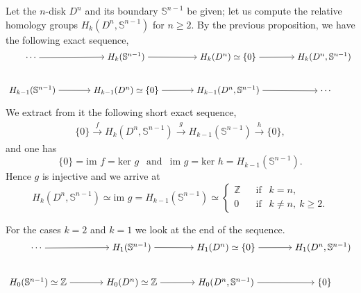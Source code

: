 \begin{example}
\label{hom_relat_disco}
Let the $n$-disk $D^n$ and its boundary $\mathbb{S}^{n-1}$ be given; let us compute the relative homology groups $H_k(D^n,\mathbb{S}^{n-1})$ for $n\ge 2$. By the previous proposition, we have the following exact sequence,
\[
\begin{tikzcd}[
  column sep=large,
  row sep=large,
  every cell/.style={math mode},
  remember picture
]
\cdots ~ \arrow[r] &
 ~ H_k(\mathbb{S}^{n-1})~  \arrow[r] &
~ H_k(D^n)\simeq \{0\} ~ \arrow[r] &
|[alias=topend]| ~H_k(D^n,\mathbb{S}^{n-1})~ \\
|[alias=botstart]| ~H_{k-1}(\mathbb{S}^{n-1})~ \arrow[r] &
~H_{k-1}(D^n)\simeq \{0\}~ \arrow[r] &
~H_{k-1}(D^n,\mathbb{S}^{n-1})~ \arrow[r] &
~\cdots
\end{tikzcd}
\]

We extract from it the following short exact sequence,
\begin{align*}
    \{0\}\overset{f}{\longrightarrow} H_k(D^n,\mathbb{S}^{n-1}) \overset{g}{\longrightarrow} H_{k-1}(\mathbb{S}^{n-1}) \overset{h}{\longrightarrow} \{0\},
\end{align*}
and one has
\begin{equation*}
    \{0\} = \text{im }f = \text{ker }g ~~\text{ and }~~ \text{im }g = \text{ker }h = H_{k-1}(\mathbb{S}^{n-1}).
\end{equation*}
Hence $g$ is injective and we arrive at
\begin{equation*}
    H_k(D^n,\mathbb{S}^{n-1}) \simeq \text{im }g = H_{k-1}(\mathbb{S}^{n-1}) \simeq
    \begin{cases}
        \mathbb{Z} &~~\text{ if }~~ k=n,\\
        0 &~~\text{ if }~~k\neq n, ~k\ge 2.
    \end{cases}
\end{equation*}

\newpage
For the cases $k=2$ and $k=1$ we look at the end of the sequence.
\[
\begin{tikzcd}[
  column sep=large,
  row sep=large,
  every cell/.style={math mode},
  remember picture
]
\cdots ~ \arrow[r] &
 ~ H_1(\mathbb{S}^{n-1})~  \arrow[r] &
~ H_1(D^n)\simeq \{0\} ~ \arrow[r] &
|[alias=topend]| ~H_1(D^n,\mathbb{S}^{n-1})~ \\
|[alias=botstart]| ~H_{0}(\mathbb{S}^{n-1})\simeq \mathbb{Z}~ \arrow[r] &
~H_{0}(D^n)\simeq \mathbb{Z}~ \arrow[r] &
~H_{0}(D^n,\mathbb{S}^{n-1})~ \arrow[r] &
~\{0\}
\end{tikzcd}
\]


\end{example}
